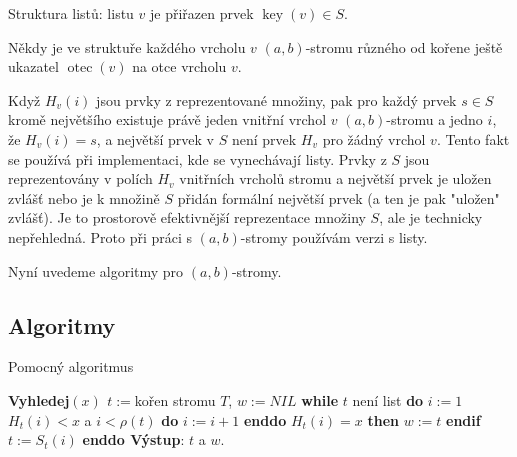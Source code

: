 \documentclass[a4paper,12pt]{article}
\DeclareMathOperator*{\otec}{otec}
\DeclareMathOperator*{\key}{key}
\begin{document}
Struktura listů:\newline 
listu $v$ je přiřazen prvek $\key(v)\in S$.

Někdy je ve struktuře každého vrcholu $v$ 
$(a,b)$-stromu různého od kořene ještě ukazatel 
$\otec(v)$ na otce vrcholu $v$.

Když $H_v(i)$ jsou prvky z reprezentované 
množiny, pak pro každý prvek $s\in S$ kromě největšího 
existuje právě jeden vnitř\-ní vrchol $v$ $(a,b)$-stromu 
a jedno $i$, že $H_v(i)=s$, a největší prvek v $S$ není prvek 
$H_v$ pro žádný vrchol $v$. Tento fakt se používá při 
implementaci, kde se vynechávají listy. Prvky z $S$ jsou 
reprezentovány v polích $H_v$ vnitř\-ních vrcholů 
stromu 
a největší prvek je uložen zvlášť nebo je k množině $S$ přidán 
formální největší prvek (a ten je pak "uložen" zvlášť). Je to prostorově 
efektivnější reprezentace množiny $S$, ale je technicky 
nepřehledná. Proto při práci s $(a,b)$-stromy používám 
verzi s listy.

Nyní uvedeme algoritmy pro $(a,b)$-stromy.

\subsection{Algoritmy}

Pomocný algoritmus

{\bf Vyhledej$(x)$\newline 
$t:=$}kořen stromu $T$, $w:=NIL$\newline 
{\bf while} $t$ není list {\bf do}\newline 
\phantom{---}$i:=1$\newline 
\phantom{---}{\bf while} $H_t(i)<x$ a $i<\rho (t)$ {\bf do} $i:=i+1$ {\bf enddo}\newline 
\phantom{---}{\bf if} $H_t(i)=x$ {\bf then} $w:=t$ {\bf endif}\newline 
$t:=S_t(i)$ {\bf enddo Výstup}: $t$ a $w$.
\end{document}
